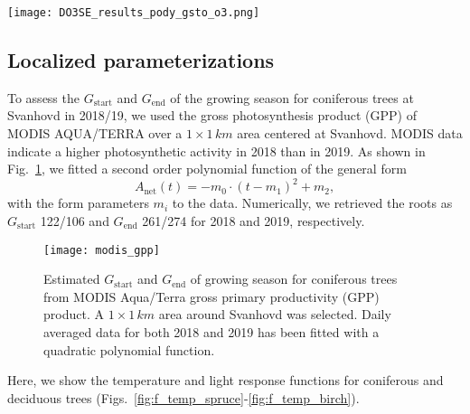 \documentclass[bg, manuscript]{copernicus}
\begin{document}
\begin{figure*}[t]
  \texttt{[image: DO3SE\_results\_pody\_gsto\_o3.png]}
  \caption{$\mathrm{DO_3SE}$ modeling results for mapping manual default parameterization. $\mathrm{POD_y}$ is shown over \unit{doy}, March--October. A flux threshold $y=1\,\unit{nmol\,m^{-2}\,s^{-1}}$ per projected leaf area (PLA) has been chosen.  are plotted on the same axis and scales as $G_\text{sto}^\text{leaf}$ but in units of $\unit{ppb}$. (a, b) deciduous tree; (c, d) coniferous tree; (e, f) perennial grassland. From left to right: 2018, 2019.}
  \label{fig:pody_mm_composit}
\end{figure*}

\subsection{Localized parameterizations}

To assess the $G_\mathrm{start}$  and $G_\mathrm{end}$ of the growing season for coniferous trees at Svanhovd in 2018/19, we used the gross photosynthesis product (GPP) of MODIS AQUA/TERRA over a $1\times 1\,\unit{km}$ area centered at Svanhovd. MODIS data indicate a higher photosynthetic activity in 2018 than in 2019. As shown in Fig.~\ref{fig:modis_gpp}, we fitted a second order polynomial function of the general form
%
\begin{equation}
A_\mathrm{net}(t) =  -m_0\cdot(t-m_1)^2+m_2,
\end{equation}
%
with the form parameters $m_i$ to the data. Numerically, we retrieved the roots as $G_\mathrm{start}$ 122/106 and $G_\mathrm{end}$ 261/274 for 2018 and 2019, respectively. 

\begin{figure}[th]
  \texttt{[image: modis\_gpp]}
  \caption{Estimated $G_\mathrm{start}$ and $G_\mathrm{end}$ of growing season for coniferous trees from MODIS Aqua/Terra gross primary productivity (GPP) product. A $1\times 1\,\unit{km}$ area around Svanhovd was selected. Daily averaged data for both 2018 and 2019 has been fitted with a quadratic polynomial function.}
  \label{fig:modis_gpp}
\end{figure}

Here, we show the temperature and light response functions for coniferous and deciduous trees (Figs.~\ref{fig:f_temp_spruce}-\ref{fig:f_temp_birch}). 
\end{document}
